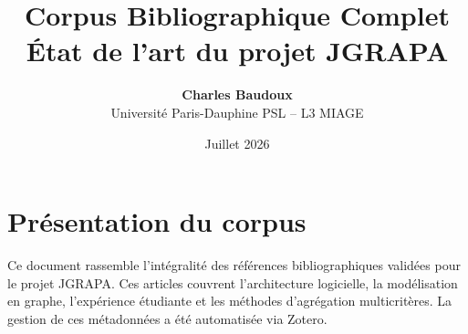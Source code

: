 \documentclass[12pt,a4paper]{article}
\title{
    \vspace{-2cm}
    \textbf{Corpus Bibliographique Complet}\\
    \large État de l'art du projet JGRAPA
}
\author{\textbf{Charles Baudoux} \\ Université Paris-Dauphine PSL -- L3 MIAGE}
\date{Juillet 2026}
\begin{document}
\maketitle

\section*{Présentation du corpus}
Ce document rassemble l'intégralité des références bibliographiques validées pour le projet JGRAPA. Ces articles couvrent l'architecture logicielle, la modélisation en graphe, l'expérience étudiante et les méthodes d'agrégation multicritères. La gestion de ces métadonnées a été automatisée via Zotero.

\nocite{*}

\newpage
 

 
\end{document}
